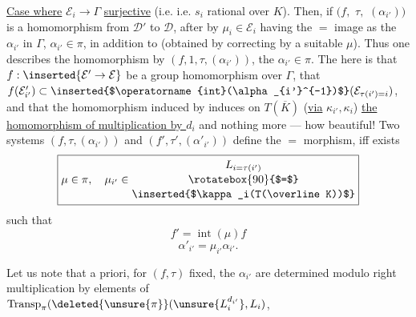 

\uline{Case where}  $\mathcal E_i\to\Gamma$  \uline{surjective} (i.e.   i.e. $s_i$ rational over $K$).
Then, if $(f,$ \deleted{\unsure{$\alpha$,}} $\tau,$  $(\alpha_{i'}))$ is a homomorphism from $\mathcal D'$ to $\mathcal D$,  after   by $\mu_i\in\mathcal E_i$ having the $=$ image as the $\alpha_{i'}$ in $\Gamma$,  $\alpha_{i'}\in\pi$, in addition to  (obtained by correcting by a suitable $\mu$).
Thus one describes the homomorphism  by $(f,1,\tau,(\alpha_{i'}))$, the $\alpha_{i'}\in\pi$. The    here is that $f:\inserted{\mathcal E'\to\mathcal E}$ be a group homomorphism over $\Gamma$, that  $f(\mathcal E'_{i'})\subset\text{\inserted{$\operatorname{int}(\alpha_{i'}^{-1})$}}(\mathcal E_{\tau(i')=i})$, and that the homomorphism induced  by    induces on $T(\overline K)$ (\uline{via} $\kappa_{i'},\kappa_i$) \uline{the homomorphism of multiplication by $d_i$} and nothing more --- how beautiful!
Two systems $(f,\tau,(\alpha_{i'}))$ and $(f',\tau',(\alpha'_{i'}))$ define the $=$ morphism, iff  exists
\[
 \boxed{\mu\in\pi,\quad\mu_{i'}\in\begin{gathered}L_{i=\tau(i')}\\[-2pt]\rotatebox{90}{$=$}\\[-2pt]\text{\inserted{$\kappa_i(T(\overline K))$}}\end{gathered}}
\]
such that
\[
 f'=\operatorname{int}(\mu)f
\]
\[
 \alpha'_{i'}=\mu_{i'}\alpha_{i'}.
\]

 Let us note that a priori, for $(f,\tau)$ fixed, the $\alpha_{i'}$ are determined modulo right multiplication by elements of $\operatorname{Transp}_{\pi}(\deleted{\unsure{\pi}}(\unsure{L_i^{d_{i'}}},L_i)$,

